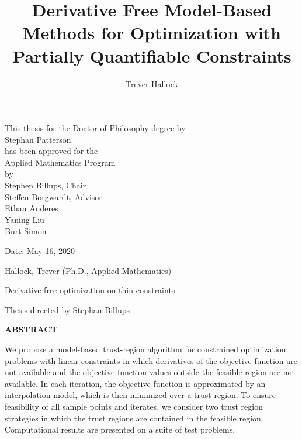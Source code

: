 \documentclass{report}
\title{Derivative Free Model-Based Methods for Optimization with Partially Quantifiable Constraints}
\author{Trever Hallock}
\begin{document}


\newpage

\vspace{1in}
    \setcounter{page}{2}

\begin{center}
This thesis for the Doctor of Philosophy degree by \\
Stephan Patterson\\
has been approved for the \\ 
Applied Mathematics Program\\
by\\
\vspace{1in}
Stephen Billups, Chair\\
Steffen Borgwardt, Advisor\\
Ethan Anderes\\
Yaning Liu \\
Burt Simon \\

\vspace{.5in}

\hfill Date: May 16, 2020
\end{center}

\newpage

\noindent Hallock, Trever (Ph.D., Applied Mathematics)

\noindent Derivative free optimization on thin constraints

\noindent Thesis directed by Stephan Billups

\begin{center}\large\textbf{ABSTRACT}\end{center}

We propose a model-based trust-region algorithm for constrained optimization problems with linear constraints in which derivatives of the objective function are not available and the objective function values outside the feasible region are not available.
In each iteration, the objective function is approximated by an interpolation model, which is then minimized over a trust region.
To ensure feasibility of all sample points and iterates, we consider two trust region strategies in which the trust regions are contained in the feasible region.
Computational results are presented on a suite of test problems.


\newpage
\end{document}
